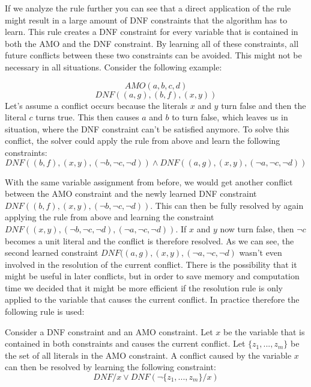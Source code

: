 If we analyze the rule further you can see that a direct application of the rule might result in a large amount of DNF constraints that the algorithm has to learn. This rule creates a DNF constraint for every variable that is contained in both the AMO and the DNF constraint. By learning all of these constraints, all future conflicts between these two constraints can be avoided. This might not be necessary in all situations. Consider the following example:
\begin{leftbar}
\begin{displaymath}
AMO(a,b,c,d)
\end{displaymath}
\begin{displaymath}
DNF((a,g),(b,f),(x,y))
\end{displaymath}
Let's assume a conflict occurs because the literals $x$ and $y$ turn false and then the literal $c$ turns true. This then causes $a$ and $b$ to turn false, which leaves us in situation, where the DNF constraint can't be satisfied anymore. To solve this conflict, the solver could apply the rule from above and learn the following constraints:
\begin{displaymath}
DNF((b,f),(x,y),(\neg b, \neg c, \neg d)) \wedge DNF((a,g),(x,y),(\neg a, \neg c, \neg d)) 
\end{displaymath}
\end{leftbar}
With the same variable assignment from before, we would get another conflict between the AMO constraint and the newly learned DNF constraint $DNF((b,f),(x,y),(\neg b, \neg c, \neg d))$. This can then be fully resolved by again applying the rule from above and learning the constraint $DNF((x,y),(\neg b, \neg c, \neg d), (\neg a, \neg c, \neg d))$. If $x$ and $y$ now turn false, then $\neg c$ becomes a unit literal and the conflict is therefore resolved. As we can see, the second learned constraint $DNF((a,g),(x,y),(\neg a, \neg c, \neg d)$ wasn't even involved in the resolution of the current conflict. There is the possibility that it might be useful in later conflicts, but in order to save memory and computation time we decided that it might be more efficient if the resolution rule is only applied to the variable that causes the current conflict. In practice therefore the following rule is used:
\begin{leftbar}
Consider a DNF constraint and an AMO constraint. Let $x$ be the variable that is contained in both constraints and causes the current conflict. Let $\{z_1,...,z_m\}$ be the set of all literals in the AMO constraint. A conflict caused by the variable $x$ can then be resolved by learning the following constraint:
\begin{displaymath}
DNF / x \vee DNF(\neg \{z_1,...,z_m\}/x)
\end{displaymath}
\end{leftbar}

